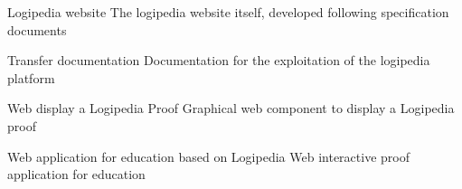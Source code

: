 \begin{workpackage}[id=access,wphases=0-48,type=MGT,
  short=Access,%
  title={Access to the infrastructure},
  lead=Irt,IrtRM=23,OcaRM=6,EduRM=12,InrRM=18]
\begin{wpdelivs}
  \begin{wpdeliv}[due=48,miles=???,id=website,dissem=PU,nature=D,lead=Irt]{Logipedia website}
    The logipedia website itself, developed following specification documents
  \end{wpdeliv}

  \begin{wpdeliv}[due=48,miles=???,id=transfer-doc,dissem=PU,nature=R,lead=Irt]{Transfer documentation}
    Documentation for the exploitation of the logipedia platform
  \end{wpdeliv}

  \begin{wpdeliv}[due=36,miles=???,id=edu-display,dissem=PU,nature=D,lead=Edu]{Web display a Logipedia Proof}
    Graphical web component to display a Logipedia proof
  \end{wpdeliv}

  \begin{wpdeliv}[due=36,miles=???,id=edu-app,dissem=PU,nature=OTHER,lead=Edu]{Web application for education based on Logipedia}
    Web interactive proof application for education
  \end{wpdeliv}

\end{wpdelivs}

\end{workpackage}

